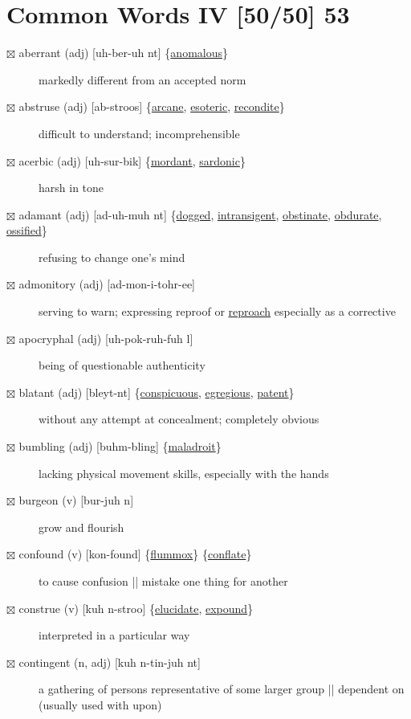 \documentclass[11pt]{article}
\begin{document}
\section{Common Words IV [50/50] 53}
\label{sec:org01057bb}
\begin{description}
\item[{$\boxtimes$ \label{org9b5d490}aberrant (adj) [uh-ber-uh nt] \{\hyperref[org463dd3f]{anomalous}\}}] markedly different from an accepted norm
\item[{$\boxtimes$ \label{org6ddbcd3}abstruse (adj) [ab-stroos] \{\hyperref[org41835e1]{arcane}, \hyperref[orga87f059]{esoteric}, \hyperref[org7a770d8]{recondite}\}}] difficult to understand; incomprehensible
\item[{$\boxtimes$ \label{orgbcb2ff6}acerbic (adj) [uh-sur-bik] \{\hyperref[org20916b3]{mordant}, \hyperref[org465533c]{sardonic}\}}] harsh in tone
\item[{$\boxtimes$ \label{org45fd4bf}adamant (adj) [ad-uh-muh nt] \{\hyperref[orgbdc7eb3]{dogged}, \hyperref[org72248e8]{intransigent}, \hyperref[orgf57f0fc]{obstinate}, \hyperref[orgbe450f7]{obdurate}, \hyperref[org2092cc9]{ossified}\}}] refusing to change one's mind
\item[{$\boxtimes$ \label{org3214a6a}admonitory (adj) [ad-mon-i-tohr-ee]}] serving to warn; expressing reproof or \hyperref[org3cb95b6]{reproach} especially as a corrective
\item[{$\boxtimes$ apocryphal (adj) [uh-pok-ruh-fuh l]}] being of questionable authenticity
\item[{$\boxtimes$ \label{org1b61d78}blatant (adj) [bleyt-nt] \{\hyperref[org6c56ea5]{conspicuous}, \hyperref[org178f47e]{egregious}, \hyperref[org70fed6f]{patent}\}}] without any attempt at concealment; completely obvious
\item[{$\boxtimes$ \label{org0a6663a}bumbling (adj) [buhm-bling] \{\hyperref[orga8f4f1d]{maladroit}\}}] lacking physical movement skills, especially with the hands
\item[{$\boxtimes$ burgeon (v) [bur-juh n]}] grow and flourish
\item[{$\boxtimes$ \label{orga32dfdd} \label{org6671323}confound (v) [kon-found] \{\hyperref[orgcdc7854]{flummox}\} \{\hyperref[org10376b8]{conflate}\}}] to cause confusion || mistake one thing for another
\item[{$\boxtimes$ \label{orgb0dc1b1}construe (v) [kuh n-stroo] \{\hyperref[orgedb44cd]{elucidate}, \hyperref[org6079d2d]{expound}\}}] interpreted in a particular way
\item[{$\boxtimes$ contingent (n, adj) [kuh n-tin-juh nt]}] a gathering of persons representative of some larger group || dependent on (usually used with upon)

\end{description}
\end{document}
